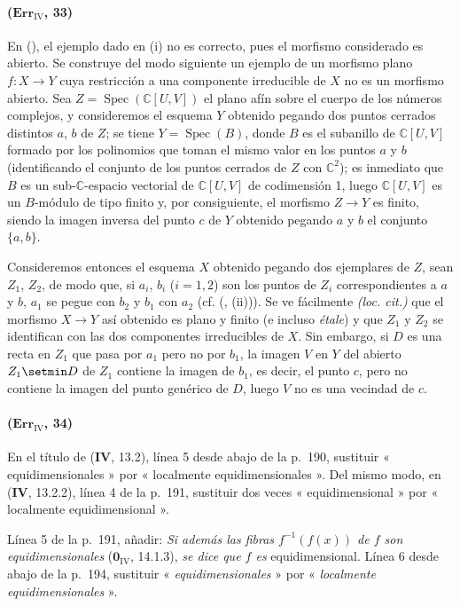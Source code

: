 \paragraph{($\mathbf{Err}_{\mathrm{IV}}$, 33)}
En ({}), el ejemplo dado
en (i) no es correcto, pues el morfismo considerado es abierto. Se
construye del modo siguiente un ejemplo de un morfismo plano $f:X\to Y$ cuya restricción
a una componente irreducible de $X$ no es un morfismo abierto.
Sea $Z=\operatorname{Spec}(\mathbb C[U,V])$ el
plano afín sobre el cuerpo de los números complejos, y consideremos el
esquema $Y$ obtenido pegando dos puntos cerrados distintos $a$, $b$ de
$Z$; se tiene $Y=\operatorname{Spec}(B)$, donde $B$ es el subanillo de
$\mathbb C[U,V]$ formado por los polinomios que toman el mismo valor en los puntos
$a$ y $b$ (identificando el conjunto de los puntos cerrados de $Z$ con
$\mathbb C^2$); es inmediato que $B$ es un sub-$\mathbb C$-espacio
vectorial de $\mathbb C[U,V]$ de codimensión 1, luego $\mathbb C[U,V]$
es un $B$-módulo de tipo finito y, por consiguiente, el morfismo $Z\to Y$ es
finito, siendo la imagen inversa del punto $c$ de $Y$ obtenido pegando
$a$ y $b$ el conjunto $\{a,b\}$.

Consideremos entonces el esquema $X$ obtenido pegando dos ejemplares de
$Z$, sean $Z_1$, $Z_2$, de modo que, si $a_i$, $b_i$ ($i=1,2$) son
los puntos de $Z_i$ correspondientes a $a$ y $b$, $a_1$ se pegue con
$b_2$ y $b_1$ con $a_2$ (cf. ({},
(ii))). Se ve fácilmente \emph{(loc. cit.)} que el morfismo $X\to Y$
así obtenido es plano y finito (e incluso \emph{étale}) y que $Z_1$ y $Z_2$
se identifican con las dos componentes irreducibles de $X$. Sin embargo, si
$D$ es una recta en $Z_1$ que pasa por $a_1$ pero no por $b_1$,
la imagen $V$ en $Y$ del abierto $Z_1\setmin D$ de $Z_1$ contiene la imagen de
$b_1$, es decir, el punto $c$, pero no contiene la imagen del punto
genérico de $D$, luego $V$ no es una vecindad de $c$.

\paragraph{($\mathbf{Err}_{\mathrm{IV}}$, 34)}
En el título de (\textbf{IV}, 13.2), línea 5 desde abajo de la p.~190, sustituir
« equidimensionales » por « localmente equidimensionales ». Del mismo modo,
en (\textbf{IV}, 13.2.2), línea 4 de la p.~191, sustituir dos veces
« equidimensional » por « localmente equidimensional ».

Línea 5 de la p.~191, añadir: \emph{Si además las fibras
$f^{-1}(f(x))$ de $f$ son equidimensionales} ($\mathbf{0}_{\mathrm{IV}}$,
14.1.3), \emph{se dice que $f$ es} equidimensional. Línea 6 desde abajo de la
p.~194, sustituir « \emph{equidimensionales} » por « \emph{localmente
equidimensionales} ».

